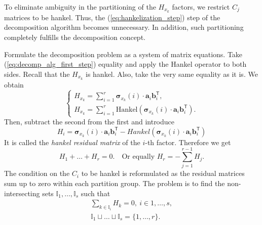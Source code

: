 \documentclass[referee, pdflatex, sn-mathphys-num]{sn-jnl}
\theoremstyle{definition}
\theoremstyle{plain}
\begin{document}
	To eliminate ambiguity in the partitioning of the $ H_{x_k} $ factors, we restrict $ C_j $ matrices to be hankel. Thus, the (\ref{eq:hankelization_step}) step of the decomposition algorithm becomes unnecessary. In addition, such partitioning completely fulfills the decomposition concept. 
	
	Formulate the decomposition problem as a system of matrix equations. Take (\ref{eq:decomp_alg_first_step}) equality and apply the Hankel operator to both sides. Recall that the $ H_{x_k} $ is hankel. Also, take the very same equality as it is. We obtain \begin{equation*}
		\begin{cases*}
			H_{x_k} = \sum\limits_{i = 1}^{r} \boldsymbol{\sigma}_{x_k}(i) \cdot \mathbf{a}_i  \mathbf{b}_i^{\mathsf{T}}, \\
			H_{x_k} = \sum\limits_{i = 1}^{r} \text{Hankel}(\boldsymbol{\sigma}_{x_k}(i) \cdot \mathbf{a}_i  \mathbf{b}_i^{\mathsf{T}}).
		\end{cases*}
	\end{equation*}	Then, subtract the second from the first and introduce \begin{equation}\label{eq:hankel_resid_matrix}
		H_i = \boldsymbol{\sigma}_{x_k}(i) \cdot \mathbf{a}_i  \mathbf{b}_i^{\mathsf{T}} - Hankel(\boldsymbol{\sigma}_{x_k}(i) \cdot \mathbf{a}_i  \mathbf{b}_i^{\mathsf{T}})
	\end{equation}	It is called the \emph{hankel residual matrix} of the $ i $-th factor. Therefore we get \begin{equation}\label{eq:residuals_equation}
		H_1 + \ldots + H_r = 0. \quad \text{Or equally } H_r = - \sum\limits_{j = 1}^{r - 1} H_j.
	\end{equation} The condition on the $ C_i $ to be hankel is reformulated as the residual matrices sum up to zero within each partition group. The problem is to find the non-intersecting sets $ \mathbb{I}_1, \ldots , \mathbb{I}_s $ such that	\begin{gather}\label{eq:decomp_opt_init}
		\sum_{k \in \mathbb{I}_i} H_k = 0, \ i \in 1, \ldots, s , \\
		\mathbb{I}_1 \sqcup \ldots \sqcup \mathbb{I}_s = \{1, \ldots, r\} . \nonumber
	\end{gather}
	
\end{document}
